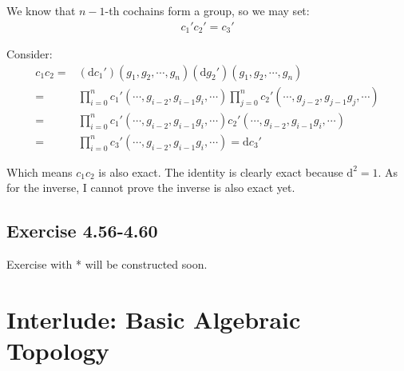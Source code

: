 \documentclass[]{ctexart}
\newcommand{\di}{\mathrm{d}}
\begin{document}
			We know that $n-1$-th cochains form a group, so we may set:
				\begin{equation*}
				\begin{aligned}
					c_1'c_2'=c_3'
				\end{aligned}
				\end{equation*}
				
			Consider:
				\begin{equation*}
				\begin{aligned}
					c_1c_2=&(\di c_1')(g_1,g_2,\cdots,g_n) (\di g_2')(g_1,g_2,\cdots,g_n)\\
					=&\prod_{i=0}^{n}c_1'(\cdots,g_{i-2},g_{i-1}g_{i},\cdots)\prod_{j=0}^{n}c_2'(\cdots,g_{j-2},g_{j-1}g_{j},\cdots)\\
					=&\prod_{i=0}^{n}c_1'(\cdots,g_{i-2},g_{i-1}g_{i},\cdots)c_2'(\cdots,g_{i-2},g_{i-1}g_{i},\cdots)\\
					=&\prod_{i=0}^{n}c_3'(\cdots,g_{i-2},g_{i-1}g_{i},\cdots)=\di c_3'
				\end{aligned}
				\end{equation*}
				
			Which means $c_1c_2$ is also exact. The identity is clearly exact because $\di ^2=1$. As for the inverse, I cannot prove the inverse is also exact yet. 
		
	
		
			
			
			
	
	\subsection{Exercise 4.56-4.60}
		Exercise with * will be constructed soon. 

\section{Interlude: Basic Algebraic Topology}
\end{document}
